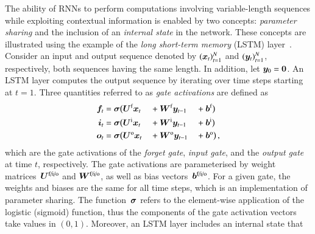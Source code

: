 
The ability of RNNs to perform computations involving variable-length sequences
while exploiting contextual information is enabled by two concepts:
\emph{parameter sharing} and the inclusion of an \emph{internal state} in the
network. These concepts are illustrated using the example of the \emph{long
  short-term memory} (LSTM) layer~\cite{lstm,gers2000learning}. Consider an
input and output sequence denoted by $(\bm{x}_{t})_{t = 1}^{N}$ and
$(\bm{y}_{t})_{t = 1}^{N}$, respectively, both sequences having the same
length. In addition, let $\bm{y}_{0} = \bm{0}$. An LSTM layer computes the
output sequence by iterating over time steps starting at $t = 1$. Three
quantities referred to as \emph{gate activations} are defined
as~\cite{Goodfellow-et-al-2016}
\begin{alignat*}{3}
  \myvec{f}_{t} &= \myvec{\sigma}\bigl(\myvec{U}^{\text{f}}  \myvec{x}_{t} &&+ \myvec{W}^{\text{f}}  \myvec{y}_{t - 1} &&+ \myvec{b}^{\text{f}}\bigr) \\
  \myvec{i}_{t} &= \myvec{\sigma}\bigl(\myvec{U}^{\text{i}}  \myvec{x}_{t} &&+ \myvec{W}^{\text{i}}  \myvec{y}_{t - 1} &&+ \myvec{b}^{\text{i}}\bigr) \\
  \myvec{o}_{t} &= \myvec{\sigma}\bigl(\myvec{U}^{\text{o}}  \myvec{x}_{t} &&+ \myvec{W}^{\text{o}}  \myvec{y}_{t - 1} &&+ \myvec{b}^{\text{o}}\bigr) \,\text{,}                                                       %
\end{alignat*}
which are the gate activations of the \emph{forget gate}, \emph{input gate}, and
the \emph{output gate} at time $t$, respectively. The gate activations are
parameterised by weight matrices~$\bm{U}^{\text{f/i/o}}$ and
$\bm{W}^{\text{f/i/o}}$, as well as bias
vectors~$\bm{b}^{\text{f/i/o}}$. For a given gate, the weights and biases are
the same for all time steps, which is an implementation of parameter sharing.
The function~$\bm{\sigma}$ refers to the element-wise application of the
logistic (sigmoid) function, thus the components of the gate activation vectors
take values in $(0, 1)$. Moreover, an LSTM layer includes an internal state that
